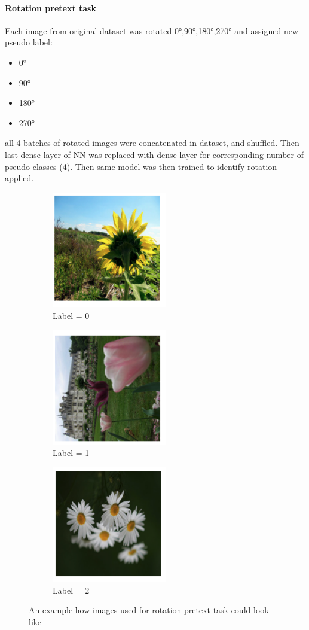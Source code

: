 \paragraph{Rotation pretext task}
Each image from original dataset was rotated 0°,90°,180°,270° and assigned new pseudo label:
\begin{itemize}
    \item 0° \textrightarrow {}
    \item 90° \textrightarrow {}
    \item 180° \textrightarrow {}
    \item 270° \textrightarrow {}
\end{itemize}
all 4 batches of rotated images were concatenated in dataset, and shuffled.
Then last dense layer of NN was replaced with dense layer for corresponding number of pseudo classes (4).
Then same model was then trained to identify rotation applied.
\begin{figure}[h]
    \begin{subfigure}{0.33\textwidth}
        \caption{Label = 0}
        \includegraphics[width=5cm]{images/rot_0}
    \end{subfigure}
    \begin{subfigure}{0.2\textwidth}
        \caption{Label = 1}
        \includegraphics[width=5cm]{images/rot_1}
    \end{subfigure}
    \begin{subfigure}{0.33\textwidth}
        \caption{Label = 2}
        \includegraphics[width=5cm]{images/rot_2}
    \end{subfigure}
    \caption{An example how images used for rotation pretext task could look like}
\end{figure}
